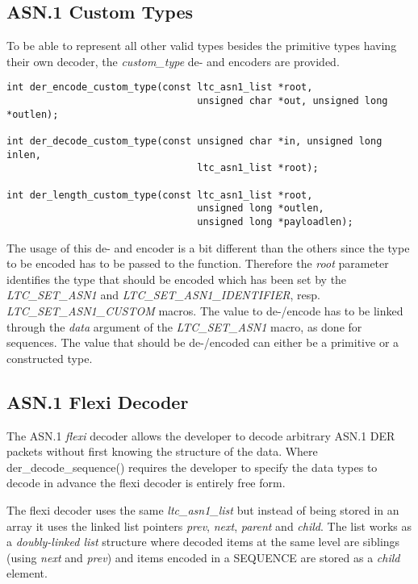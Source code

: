 \documentclass[synpaper]{book}
\begin{document}
\subsection{ASN.1 Custom Types}

To be able to represent all other valid types besides the primitive types having their own decoder, the \textit{custom\_type} de- and encoders are provided.

   
\begin{verbatim}
int der_encode_custom_type(const ltc_asn1_list *root,
                                 unsigned char *out, unsigned long *outlen);

int der_decode_custom_type(const unsigned char *in, unsigned long inlen,
                                 ltc_asn1_list *root);

int der_length_custom_type(const ltc_asn1_list *root,
                                 unsigned long *outlen,
                                 unsigned long *payloadlen);
\end{verbatim}

The usage of this de- and encoder is a bit different than the others since the type to be encoded has to be passed to the function.
Therefore the \textit{root} parameter identifies the type that should be encoded which has been set by the \textit{LTC\_SET\_ASN1}
and \textit{LTC\_SET\_ASN1\_IDENTIFIER}, resp. \textit{LTC\_SET\_ASN1\_CUSTOM} macros.
The value to de-/encode has to be linked through the \textit{data} argument of the \textit{LTC\_SET\_ASN1} macro, as done for sequences.
The value that should be de-/encoded can either be a primitive or a constructed type.

\subsection{ASN.1 Flexi Decoder}

The ASN.1 \textit{flexi} decoder allows the developer to decode arbitrary ASN.1 DER packets without first knowing the structure of the data.
Where der\_decode\_sequence() requires the developer to specify the data types to decode in advance the flexi decoder is entirely free form.

The flexi decoder uses the same \textit{ltc\_asn1\_list} but instead of being stored in an array it uses the linked list pointers \textit{prev}, \textit{next}, \textit{parent}
and \textit{child}.  The list works as a \textit{doubly-linked list} structure where decoded items at the same level are siblings (using \textit{next} and \textit{prev}) and items
encoded in a SEQUENCE are stored as a \textit{child} element.
\end{document}
